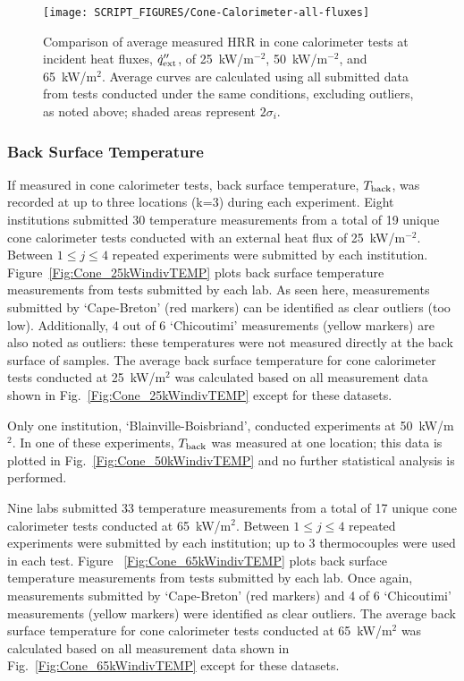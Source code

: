 \documentclass{book}
\begin{document}
\begin{figure}
  \centering
  \texttt{[image: SCRIPT\_FIGURES/Cone-Calorimeter-all-fluxes]}
  \caption{Comparison of average measured HRR in cone calorimeter tests at incident heat fluxes, $\dot{q}_{\rm ext}''$, of 25~kW/m$^{-2}$, 50~kW/m$^{-2}$, and 65~kW/m$^2$. Average curves are calculated using all submitted data from tests conducted under the same conditions, excluding outliers, as noted above; shaded areas represent $2\sigma_i$.}
  \label{Fig:Cone-Calorimeter-all-fluxes}
\end{figure}

\newpage
\subsubsection{Back Surface Temperature}

If measured in cone calorimeter tests, back surface temperature, $T_{\rm back}$, was recorded at up to three locations (k=3) during each experiment. Eight institutions submitted 30 temperature measurements from a total of 19 unique cone calorimeter tests conducted with an external heat flux of 25~kW/m$^{-2}$. Between $1\le j\le4$ repeated experiments were submitted by each institution.  Figure~\ref{Fig:Cone_25kWindivTEMP} plots back surface temperature measurements from tests submitted by each lab. As seen here, measurements submitted by ‘Cape-Breton’ (red markers) can be identified as clear outliers (too low). Additionally, 4 out of 6 ‘Chicoutimi’ measurements (yellow markers) are also noted as outliers: these temperatures were not measured directly at the back surface of samples. The average back surface temperature for cone calorimeter tests conducted at 25~kW/m$^2$ was calculated based on all measurement data shown in Fig.~\ref{Fig:Cone_25kWindivTEMP} except for these datasets.

Only one institution, ‘Blainville-Boisbriand’, conducted experiments at 50~kW/m$^2$. In one of these experiments, $T_{\rm back}$ was measured at one location; this data is plotted in Fig.~\ref{Fig:Cone_50kWindivTEMP} and no further statistical analysis is performed.

Nine labs submitted 33 temperature measurements from a total of 17 unique cone calorimeter tests conducted at 65~kW/m$^2$. Between $1\le j\le4$ repeated experiments were submitted by each institution; up to 3 thermocouples were used in each test. Figure ~\ref{Fig:Cone_65kWindivTEMP} plots back surface temperature measurements from tests submitted by each lab. Once again, measurements  submitted by ‘Cape-Breton’ (red markers) and 4 of 6 ‘Chicoutimi’ measurements (yellow markers) were identified as clear outliers. The average back surface temperature for cone calorimeter tests conducted at 65~kW/m$^2$ was calculated based on all measurement data shown in Fig.~\ref{Fig:Cone_65kWindivTEMP} except for these datasets.
\end{document}
